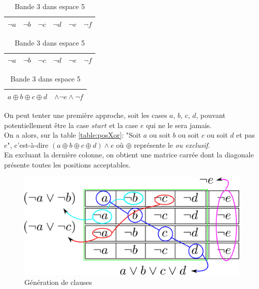 \documentclass[a4paper,12pt]{report}
\newcommand\black{\cellcolor{black}}
\newcommand\grey{\cellcolor{black!50}}
\begin{document}
\begin{table}[H]
\begin{subtable}[B]{0.5\textwidth}
			\begin{tabular}{|c|c|c|c||c|c|}
			\hline 
			$\lnot a$ & $\lnot b$ &\grey \color{gray}$\lnot$\color{white}$c$ & 
			\black \color{white}$\lnot d$ &\black \color{white}$\lnot e$  & $\lnot f$\\ 
			\hline
			\end{tabular}

			\begin{tabular}{|c|c|c|c||c|c|}
			\hline 
			$\lnot a$ & $\lnot b$ & $\lnot c$  &\grey \color{gray}$\lnot$\color{white}$d$ & 
			\black \color{white}$\lnot e$ &\black \color{white}$\lnot f$  \\ 
			\hline
			\end{tabular}

			\begin{tabular}{|c c c c c c|}
			\hline 
			\multicolumn{4}{|c||}{$a \oplus b \oplus c \oplus d$} & \multicolumn{2}{c|}{$\wedge \lnot e \wedge \lnot f$} \\ 
			\hline
			\end{tabular}			
			
        \caption{Bande 3 dans espace 5}
        \label{table:tailleE}
    \end{subtable}
\end{table}

On peut tenter une première approche, soit les cases $a$, $b$, $c$, $d$, pouvant potentiellement être la case $start$ et la case $e$ qui ne le sera jamais. \\
On a alors, sur la table \ref{table:posXor}: "Soit $a$ ou soit $b$ ou soit $c$ ou soit $d$ et pas $e$", c'est-à-dire $(a \oplus b \oplus c \oplus d) \wedge e$ où $\oplus$ représente le \textit{ou exclusif}.\\

En excluant la dernière colonne, on obtient une matrice carrée dont la diagonale présente toutes les positions acceptables. \\
\begin{figure}[H]
\centering
\includegraphics[scale=0.3]{generationFNC.png}
\caption{Génération de clauses}
\label{fig:generationFNC}
\end{figure}
\end{document}
